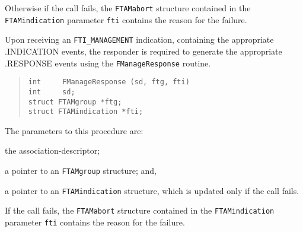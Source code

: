 Otherwise if the call fails,
the \verb"FTAMabort" structure contained in the
\verb"FTAMindication" parameter \verb"fti" contains the reason for the failure.

Upon receiving an \verb"FTI_MANAGEMENT" indication,
containing the appropriate {\sf .INDICATION\/} events,
the responder is required to generate the appropriate {\sf .RESPONSE\/}
events using the \verb"FManageResponse" routine.
\begin{quote}\small\begin{verbatim}
int     FManageResponse (sd, ftg, fti)
int     sd;
struct FTAMgroup *ftg;
struct FTAMindication *fti;
\end{verbatim}\end{quote}
The parameters to this procedure are:
\begin{describe}
\item[\verb"sd":] the association-descriptor;

\item[\verb"ftg":] a pointer to an \verb"FTAMgroup" structure;
and,

\item[\verb"fti":] a pointer to an \verb"FTAMindication" structure, which is
updated only if the call fails.
\end{describe}
If the call fails,
the \verb"FTAMabort" structure contained in the
\verb"FTAMindication" parameter \verb"fti" contains the reason for the failure.

